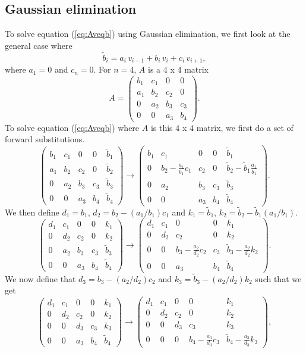 \documentclass[norsk,a4paper,12pt]{article}
\begin{document}
\subsection{Gaussian elimination}
To solve equation (\ref{eq:Aveqb}) using Gaussian elimination, we first look at the general case where $$\tilde{
b}_i = a_i\,v_{i-1} + b_i\,v_i + c_i\,v_{i+1},$$ where $a_1=0$ and $c_n=0$.
For $n=4$, $A$ is a $4$ x $4$ matrix
$$A = \begin{pmatrix}
b_1&c_1&0&0\\
a_1&b_2&c_2&0\\
0&a_2&b_3&c_3\\
0&0&a_3&b_4
\end{pmatrix}.
$$
To solve equation (\ref{eq:Aveqb}) where $A$ is this $4$ x $4$ matrix, we first do a set of forward substitutions.
$$\begin{pmatrix}
b_1&c_1&0&0&\tilde{b}_1\\
a_1&b_2&c_2&0&\tilde{b}_2\\
0&a_2&b_3&c_3&\tilde{b}_3\\
0&0&a_3&b_4&\tilde{b}_4
\end{pmatrix} \rightarrow \begin{pmatrix}
b_1&c_1&0&0&\tilde{b}_1\\
0&b_2-\frac{a_1}{b_1}c_1&c_2&0&\tilde{b}_2-\tilde{b}_1\frac{a_1}{b_1}\\
0&a_2&b_3&c_3&\tilde{b}_3\\
0&0&a_3&b_4&\tilde{b}_4
\end{pmatrix}.$$
We then define $d_1=b_1$, $d_2=b_2-(a_1/b_1)c_1$ and $k_1=\tilde{b}_1$, $k_2=\tilde{b}_2-\tilde{b}_1(a_1/b_1)$. 
$$\begin{pmatrix}
d_1&c_1&0&0&k_1\\
0&d_2&c_2&0&k_2\\
0&a_2&b_3&c_3&\tilde{b}_3\\
0&0&a_3&b_4&\tilde{b}_4
\end{pmatrix} \rightarrow \begin{pmatrix}
d_1&c_1&0&0&k_1\\
0&d_2&c_2&0&k_2\\
0&0&b_3-\frac{a_2}{d_2}c_2&c_3&\tilde{b}_3-\frac{a_2}{d_2}k_2\\
0&0&a_3&b_4&\tilde{b}_4
\end{pmatrix}.$$
We now define that $d_3 = b_3-(a_2/d_2)c_2$ and $k_3=\tilde{b}_3-(a_2/d_2)k_2$ such that we get
$$\begin{pmatrix}
d_1&c_1&0&0&k_1\\
0&d_2&c_2&0&k_2\\
0&0&d_3&c_3&k_3\\
0&0&a_3&b_4&\tilde{b}_4
\end{pmatrix}\rightarrow \begin{pmatrix}
d_1&c_1&0&0&k_1\\
0&d_2&c_2&0&k_2\\
0&0&d_3&c_3&k_3\\
0&0&0&b_4-\frac{a_3}{d_3}c_3&\tilde{b}_4-\frac{a_3}{d_3}k_3
\end{pmatrix},$$
\end{document}
